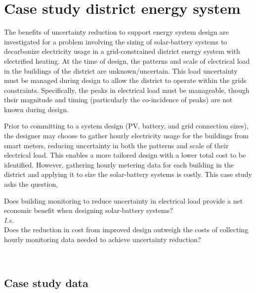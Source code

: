 \section{Case study district energy system} \label{sec:districts-experiment}


The benefits of uncertainty reduction to support energy system design are investigated for a problem involving the sizing of solar-battery systems to decarbonize electricity usage in a grid-constrained district energy system with electrified heating. At the time of design, the patterns and scale of electrical load in the buildings of the district are unknown/uncertain. This load uncertainty must be managed during design to allow the district to operate within the grids constraints. Specifically, the peaks in electrical load must be manageable, though their magnitude and timing (particularly the co-incidence of peaks) are not known during design.

Prior to committing to a system design (PV, battery, and grid connection sizes), the designer may choose to gather hourly electricity usage for the buildings from smart meters, reducing uncertainty in both the patterns and scale of their electrical load. This enables a more tailored design with a lower total cost to be identified. However, gathering hourly metering data for each building in the district and applying it to size the solar-battery systems is costly. This case study asks the question,\\

\begin{cbox}[colback=Aquamarine!10!white]{}
    Does building monitoring to reduce uncertainty in electrical load provide a net economic benefit when designing solar-battery systems?\\
    \hspace*{0.5cm}\textit{I.e.}\\
    Does the reduction in cost from improved design outweigh the costs of collecting hourly monitoring data needed to achieve uncertainty reduction?
\end{cbox}\

\subsection{Case study data} \label{sec:districts-data}

